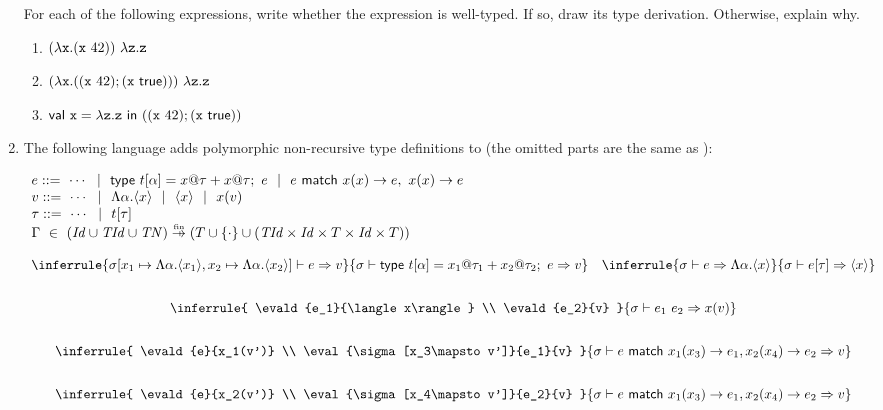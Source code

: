 \begin{enumerate}
For each of the following expressions, write whether the expression is
well-typed. If so, draw its type derivation. Otherwise, explain why.
\begin{enumerate}
  \item $(\lambda \code{x}.(\code{x}\ 42))\ \lambda \code{z}.\code{z}$
  \item $(\lambda \texttt{x}.((\texttt{x}\ 42); (\texttt{x}\ \textsf{true})))\ \lambda \texttt{z}.\texttt{z}$
  \item $\textsf{val}\ \code{x}=\lambda \code{z}.\code{z}\ \textsf{in}\ ((\code{x}\ 42); (\code{x}\ \textsf{true}))$
\end{enumerate}

\item The following language adds
polymorphic non-recursive type definitions to \texttt{\lang}
(the omitted parts are the same as \texttt{\lang}):

\vspace{1em}
$
  \begin{array}{l}
    e ::=\ \cdots\ \ |\ \ \textsf{type}\ t[\alpha]=x@\tau+x@\tau;\ e\ \ |\ \
           e\ \textsf{match}\ x(x)\rightarrow e,\ x(x)\rightarrow e \\
    v ::=\ \cdots\ \ |\ \ \Lambda\alpha.\langle x\rangle\ \ |\ \ \langle x\rangle\ \ |\ \  x(v) \\
    \tau ::=\ \cdots\ \ |\ \  t[\tau] \\
    \Gamma\ \in\ (\embox{Id}\cup\embox{TId}\cup\embox{TN})\finto
    {(T\cup\{\cdot\}
    \cup(\embox{TId}\times\embox{Id}\times T\times\embox{Id}\times T))}
  \end{array}
$
\vspace{0.5em}

$
  \begin{array}{c}
  \inferrule
  { \eval{\sigma[x_1\mapsto\Lambda\alpha.\langle x_1\rangle,x_2\mapsto\Lambda\alpha.\langle x_2\rangle]}{e}{v} }
  { \evald{\textsf{type}\ t[\alpha]=x_1@\tau_1+x_2@\tau_2;\ e}{v} }
  \quad
  \inferrule
  { \evald{e}{\Lambda \alpha.\langle x\rangle} }
  { \evald{\etapp{e}{\tau}}{\langle x\rangle} }
  \\[2em]
  \inferrule
  { \evald{e_1}{\langle x\rangle} \\ \evald{e_2}{v} }
  { \evald{\eapp{e_1}{e_2}}{x(v)} }
  \\[2em]
  \inferrule
  { \evald{e}{x_1(v')} \\ \eval{\sigma[x_3\mapsto v']}{e_1}{v} }
  { \evald{e\ \textsf{match}\ x_1(x_3)\rightarrow e_1,x_2(x_4)\rightarrow e_2}{v} }
  \\[2em]
  \inferrule
  { \evald{e}{x_2(v')} \\ \eval{\sigma[x_4\mapsto v']}{e_2}{v} }
  { \evald{e\ \textsf{match}\ x_1(x_3)\rightarrow e_1,x_2(x_4)\rightarrow e_2}{v} }
  \end{array}
$
\vspace{0.5em}


\end{enumerate}
